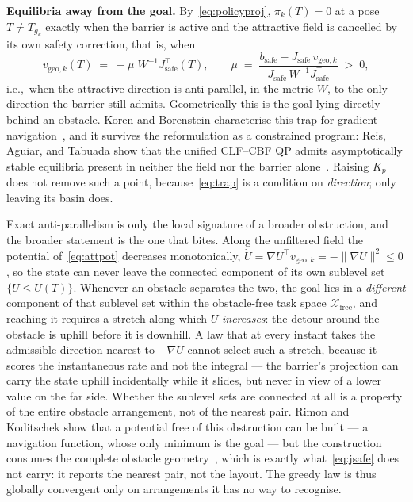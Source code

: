 \documentclass[12pt,a4paper,twoside,openright]{report}
\begin{document}
\textbf{Equilibria away from the goal.} By~\eqref{eq:policyproj}, $\pi_k(T) = 0$ at a pose $T \neq T_{g_k}$ exactly when the barrier is active and the attractive field is cancelled by its own safety correction, that is, when
\begin{equation}
v_{\text{geo},k}(T) \;=\; -\mu\;W^{-1}J_{\text{safe}}^{\top}(T),
\qquad
\mu \;=\; \frac{b_{\text{safe}} - J_{\text{safe}}\,v_{\text{geo},k}}{J_{\text{safe}}\,W^{-1}J_{\text{safe}}^{\top}} \;>\; 0,
\label{eq:trap}
\end{equation}
i.e.,\ when the attractive direction is anti-parallel, in the metric $W$, to the only direction the barrier still admits. Geometrically this is the goal lying directly behind an obstacle. Koren and Borenstein characterise this trap for gradient navigation~\cite{koren1991potential}, and it survives the reformulation as a constrained program: Reis, Aguiar, and Tabuada show that the unified CLF--CBF QP admits asymptotically stable equilibria present in neither the field nor the barrier alone~\cite{reis2021undesirable}. Raising $K_p$ does not remove such a point, because~\eqref{eq:trap} is a condition on \emph{direction}; only leaving its basin does.

Exact anti-parallelism is only the local signature of a broader obstruction, and the broader statement is the one that bites. Along the unfiltered field the potential of~\eqref{eq:attpot} decreases monotonically, $\dot{U} = \nabla U^{\top}v_{\text{geo},k} = -\lVert\nabla U\rVert^{2} \le 0$, so the state can never leave the connected component of its own sublevel set $\{U \le U(T)\}$. Whenever an obstacle separates the two, the goal lies in a \emph{different} component of that sublevel set within the obstacle-free task space $\mathcal{X}_{\text{free}}$, and reaching it requires a stretch along which $U$ \emph{increases}: the detour around the obstacle is uphill before it is downhill. A law that at every instant takes the admissible direction nearest to $-\nabla U$ cannot select such a stretch, because it scores the instantaneous rate and not the integral --- the barrier's projection can carry the state uphill incidentally while it slides, but never in view of a lower value on the far side. Whether the sublevel sets are connected at all is a property of the entire obstacle arrangement, not of the nearest pair. Rimon and Koditschek show that a potential free of this obstruction can be built --- a navigation function, whose only minimum is the goal --- but the construction consumes the complete obstacle geometry~\cite{rimon1992exact}, which is exactly what~\eqref{eq:jsafe} does not carry: it reports the nearest pair, not the layout. The greedy law is thus globally convergent only on arrangements it has no way to recognise.
\end{document}
